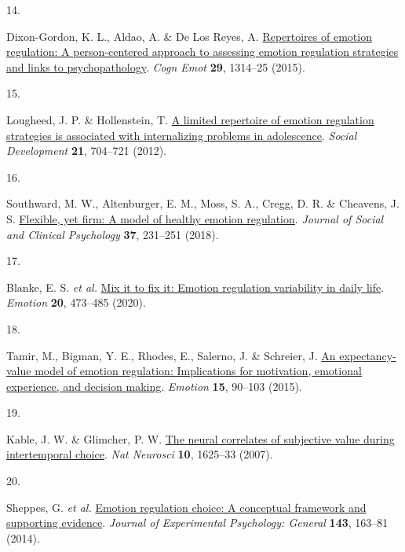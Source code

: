 \documentclass[
  man,floatsintext]{apa6}
\newlength{\cslhangindent}
\newlength{\csllabelwidth}
\newlength{\cslentryspacingunit} %
\newenvironment{CSLReferences}[2] %
 {%
  \setlength{\parindent}{0pt}
  \ifodd #1
  \let\oldpar\par
  \def\par{\hangindent=\cslhangindent\oldpar}
  \fi
  \setlength{\parskip}{#2\cslentryspacingunit}
 }%
 {}
\newcommand{\CSLLeftMargin}[1]{\parbox[t]{\csllabelwidth}{#1}}
\newcommand{\CSLRightInline}[1]{\parbox[t]{\linewidth - \csllabelwidth}{#1}\break}
\begin{document}
\begin{CSLReferences}{0}{0}
\leavevmode{}%
\CSLLeftMargin{14. }%
\CSLRightInline{Dixon-Gordon, K. L., Aldao, A. \& De Los Reyes, A. \href{https://doi.org/10.1080/02699931.2014.983046}{Repertoires of emotion regulation: A person-centered approach to assessing emotion regulation strategies and links to psychopathology}. \emph{Cogn Emot} \textbf{29}, 1314--25 (2015).}

\leavevmode{}%
\CSLLeftMargin{15. }%
\CSLRightInline{Lougheed, J. P. \& Hollenstein, T. \href{https://doi.org/10.1111/j.1467-9507.2012.00663.x}{A limited repertoire of emotion regulation strategies is associated with internalizing problems in adolescence}. \emph{Social Development} \textbf{21}, 704--721 (2012).}

\leavevmode{}%
\CSLLeftMargin{16. }%
\CSLRightInline{Southward, M. W., Altenburger, E. M., Moss, S. A., Cregg, D. R. \& Cheavens, J. S. \href{https://doi.org/DOI\%2010.1521/jscp.2018.37.4.231}{Flexible, yet firm: A model of healthy emotion regulation}. \emph{Journal of Social and Clinical Psychology} \textbf{37}, 231--251 (2018).}

\leavevmode{}%
\CSLLeftMargin{17. }%
\CSLRightInline{Blanke, E. S. \emph{et al.} \href{https://doi.org/10.1037/emo0000566}{Mix it to fix it: Emotion regulation variability in daily life}. \emph{Emotion} \textbf{20}, 473--485 (2020).}

\leavevmode{}%
\CSLLeftMargin{18. }%
\CSLRightInline{Tamir, M., Bigman, Y. E., Rhodes, E., Salerno, J. \& Schreier, J. \href{https://doi.org/10.1037/emo0000021}{An expectancy-value model of emotion regulation: Implications for motivation, emotional experience, and decision making}. \emph{Emotion} \textbf{15}, 90--103 (2015).}

\leavevmode{}%
\CSLLeftMargin{19. }%
\CSLRightInline{Kable, J. W. \& Glimcher, P. W. \href{https://doi.org/10.1038/nn2007}{The neural correlates of subjective value during intertemporal choice}. \emph{Nat Neurosci} \textbf{10}, 1625--33 (2007).}

\leavevmode{}%
\CSLLeftMargin{20. }%
\CSLRightInline{Sheppes, G. \emph{et al.} \href{https://doi.org/10.1037/a0030831}{Emotion regulation choice: A conceptual framework and supporting evidence}. \emph{Journal of Experimental Psychology: General} \textbf{143}, 163--81 (2014).}


\end{CSLReferences}
\end{document}
